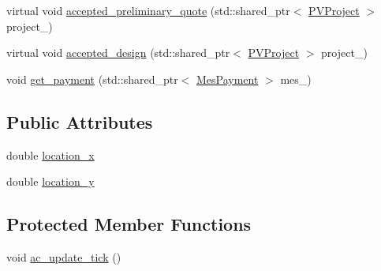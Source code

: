 {\bf }\par
\begin{DoxyCompactItemize}
\item 
virtual void \hyperlink{classsolar__core_1_1_s_e_i_ad683e480828c042d311a18cefbf2e95d}{accepted\+\_\+preliminary\+\_\+quote} (std\+::shared\+\_\+ptr$<$ \hyperlink{classsolar__core_1_1_p_v_project}{P\+V\+Project} $>$ project\+\_\+)
\end{DoxyCompactItemize}

{\bf }\par
\begin{DoxyCompactItemize}
\item 
virtual void \hyperlink{classsolar__core_1_1_s_e_i_a007004337169bac4c67b66e37ca89767}{accepted\+\_\+design} (std\+::shared\+\_\+ptr$<$ \hyperlink{classsolar__core_1_1_p_v_project}{P\+V\+Project} $>$ project\+\_\+)
\end{DoxyCompactItemize}

{\bf }\par
\begin{DoxyCompactItemize}
\item 
void \hyperlink{classsolar__core_1_1_s_e_i_a7f24aa13f3d62ec8890f526e12a3351c}{get\+\_\+payment} (std\+::shared\+\_\+ptr$<$ \hyperlink{classsolar__core_1_1_mes_payment}{Mes\+Payment} $>$ mes\+\_\+)
\end{DoxyCompactItemize}

\subsection*{Public Attributes}
{\bf }\par
\begin{DoxyCompactItemize}
\item 
double \hyperlink{classsolar__core_1_1_s_e_i_a3de17f788667889770edaf7dc0fc054d}{location\+\_\+x}
\item 
double \hyperlink{classsolar__core_1_1_s_e_i_a5fc331197d08788392c3af1903f25763}{location\+\_\+y}
\end{DoxyCompactItemize}

\subsection*{Protected Member Functions}
{\bf }\par
\begin{DoxyCompactItemize}
\item 
void \hyperlink{classsolar__core_1_1_s_e_i_a51873235b9ab1795b5616e672c75e499}{ac\+\_\+update\+\_\+tick} ()
\end{DoxyCompactItemize}

